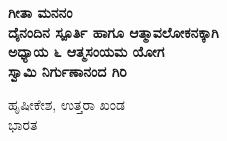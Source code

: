 \begin{titlepage}
    \begin{center}
        \vspace*{0.5cm}
            
        {\Huge
        \textbf{\color{blue}\fontsize{50}{60}\selectfont ಗೀತಾ ಮನನಂ}}
        \textbf{\\ \small \color{black}ದೈನಂದಿನ ಸ್ಪೂರ್ತಿ ಹಾಗೂ ಆತ್ಮಾವಲೋಕನಕ್ಕಾಗಿ}\\ 
		\vspace{1.0cm}
		\textbf{{\large \color{black} ಅಧ್ಯಾಯ ೬ ಆತ್ಮಸಂಯಮ ಯೋಗ}}\\		
        \vspace{6.0cm}
        \textbf{{\Large \color{blue}\mananamfont ಸ್ವಾಮಿ ನಿರ್ಗುಣಾನಂದ ಗಿರಿ}}\\    
        
		
            
        \vfill
            
        
            
        \vspace{0.1cm}
        {\color{black}    
		
		{{\large \color{blue}ಹೃಷೀಕೇಶ, ಉತ್ತರಾ ಖಂಡ}\\\normalsize ಭಾರತ}
        }
    \end{center}
\end{titlepage}
\nopagecolor%